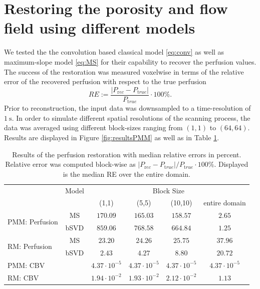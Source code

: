 \documentclass[paper=a4, fontsize=12pt,parskip=half,headings=small]{scrartcl}
\begin{document}
	

	\section{Restoring the porosity and flow field using different models}

	We tested the the convolution based classical model \eqref{eq:conv} as well as maximum-slope model \eqref{eq:MS} for their capability to recover the perfusion values.
	The success of the restoration was measured voxelwise in terms of the relative error of the recovered perfusion with respect to the true perfusion
	\[
		RE := \frac{\vert P_{\mathrm rec} - P_{\mathrm true}\vert}{P_{\mathrm true}}\cdot 100\%.
	\]
	Prior to reconstruction, the input data was downsampled to a time-resolution of $\SI{1}{\second}$.
	In order to simulate different spatial resolutions of the scanning process, the data was averaged using different block-sizes ranging from $(1,1)$ to $(64,64)$.
	Results are displayed in Figure \ref{fig:resultsPMM} as well as in Table \ref{tab:resultsSim}.
	
	\begin{table}[H]
		\caption{Results of the perfusion restoration with median relative errors in percent. Relative error was computed block-wise as $\vert P_{\mathrm rec} - P_{\mathrm true}\vert / P_{\mathrm true}\cdot 100\%$. Displayed is the median RE over the entire domain.}
		\centering
		\begin{tabular}{l c c c c c }
			& Model & \multicolumn{4}{c}{Block Size}\\
			 					 			& 		& (1,1) 	& (5,5)		& (10,10)	& entire domain \\
			\toprule
			\multirow{2}{*}{PMM: Perfusion} & MS 	& $170.09$ 	& $165.03$ 	& $158.57$	& $2.65$ \\
			 					 	   		& bSVD  & $859.06$ 	& $768.58$ 	& $664.84$	& $1.25$ \\
			\multirow{2}{*}{RM: Perfusion} & MS 	& $23.20$ 	& $24.26$ 	& $25.75$ 	& $37.96$ \\
			 					 			& bSVD  & $2.43$ 	& $4.27$ 	& $8.80$ 	& $20.72$ \\
			\midrule											
			PMM: CBV & & $4.37\cdot10^{-5}$      & $4.37\cdot10^{-5}$		& $4.37\cdot10^{-5}$		& $4.37\cdot10^{-5}$ \\											
			RM:  CBV & & $1.94\cdot10^{-2}$      & $1.93\cdot10^{-2}$		& $2.12\cdot10^{-2}$		& $1.13$ 			
		\end{tabular}
		\label{tab:resultsSim}
	\end{table}
	
\end{document}
